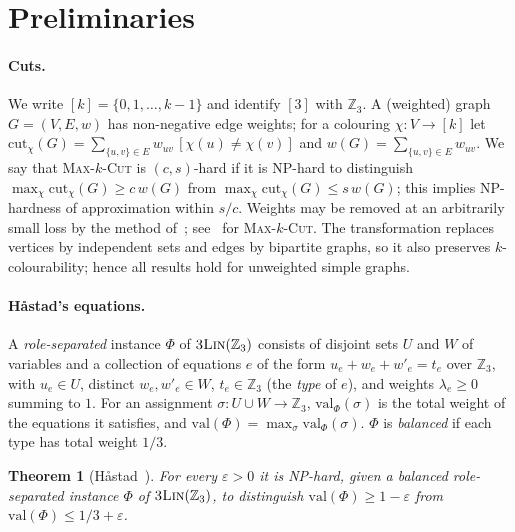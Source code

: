 \documentclass[11pt,letterpaper]{article}
\newtheorem{theorem}{Theorem}[section]
\theoremstyle{remark}
\newcommand{\MC}[1]{\textup{\textsc{Max-$#1$-Cut}}}
\newcommand{\lin}{\textup{\textsc{3Lin}}(\mathbb{Z}_3)}
\newcommand{\Z}{\mathbb{Z}}
\newcommand{\eps}{\varepsilon}
\newcommand{\cut}{\mathrm{cut}}
\newcommand{\val}{\mathrm{val}}
\begin{document}
\section{Preliminaries}\label{sec:prelim}

\paragraph{Cuts.} We write $[k]=\{0,1,\dots,k-1\}$ and identify $[3]$ with $\Z_3$. A (weighted) graph
$G=(V,E,w)$ has non-negative edge weights; for a colouring $\chi\colon V\to[k]$ let
$\cut_\chi(G)=\sum_{\{u,v\}\in E} w_{uv}\,[\chi(u)\neq\chi(v)]$ and $w(G)=\sum_{\{u,v\}\in E} w_{uv}$. We say that
\MC{k} is $(c,s)$-hard if it is NP-hard to distinguish $\max_\chi \cut_\chi(G)\ge c\,w(G)$ from
$\max_\chi \cut_\chi(G)\le s\, w(G)$; this implies NP-hardness of approximation within $s/c$. Weights may
be removed at an arbitrarily small loss by the method of~\cite{CST01}; see~\cite[Remark~2.6]{GS13} for
\MC{k}. The transformation replaces vertices by independent sets and edges by bipartite graphs, so it
also preserves $k$-colourability; hence all results hold for unweighted simple graphs.

\paragraph{H\aa stad's equations.}
A \emph{role-separated} instance $\Phi$ of $\lin$ consists of disjoint sets $U$ and $W$ of variables and a
collection of equations $e$ of the form $u_e+w_e+w'_e = t_e$ over $\Z_3$, with $u_e\in U$, distinct
$w_e,w'_e\in W$, $t_e\in\Z_3$ (the \emph{type} of $e$), and weights $\lambda_e\ge0$ summing to $1$. For an
assignment $\sigma\colon U\cup W\to\Z_3$, $\val_\Phi(\sigma)$ is the total weight of the equations it
satisfies, and $\val(\Phi)=\max_\sigma\val_\Phi(\sigma)$. $\Phi$ is \emph{balanced} if each type has total
weight $1/3$.

\begin{theorem}[H\aa stad~\cite{Hastad01}]\label{thm:hastad}
For every $\eps>0$ it is NP-hard, given a balanced role-separated instance $\Phi$ of $\lin$, to
distinguish $\val(\Phi)\ge 1-\eps$ from $\val(\Phi)\le 1/3+\eps$.
\end{theorem}
\end{document}
